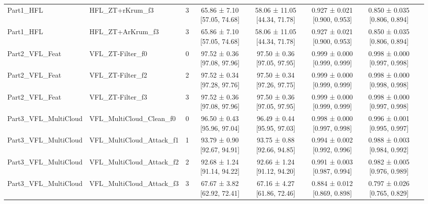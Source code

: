 \begin{table}[htbp]
\begin{tabular}{llcccccc}
Part1\_HFL & HFL\_ZT+rKrum\_f3 & 3 & 65.86 ± 7.10 [57.05, 74.68] & 58.06 ± 11.05 [44.34, 71.78] & 0.927 ± 0.021 [0.900, 0.953] & 0.850 ± 0.035 [0.806, 0.894] \\
Part1\_HFL & HFL\_ZT+ArKrum\_f3 & 3 & 65.86 ± 7.10 [57.05, 74.68] & 58.06 ± 11.05 [44.34, 71.78] & 0.927 ± 0.021 [0.900, 0.953] & 0.850 ± 0.035 [0.806, 0.894] \\
Part2\_VFL\_Feat & VFL\_ZT-Filter\_f0 & 0 & 97.52 ± 0.36 [97.08, 97.96] & 97.50 ± 0.36 [97.05, 97.95] & 0.999 ± 0.000 [0.999, 0.999] & 0.998 ± 0.000 [0.997, 0.998] \\
Part2\_VFL\_Feat & VFL\_ZT-Filter\_f2 & 2 & 97.52 ± 0.34 [97.28, 97.76] & 97.50 ± 0.34 [97.26, 97.75] & 0.999 ± 0.000 [0.999, 0.999] & 0.998 ± 0.000 [0.998, 0.998] \\
Part2\_VFL\_Feat & VFL\_ZT-Filter\_f3 & 3 & 97.52 ± 0.36 [97.08, 97.96] & 97.50 ± 0.36 [97.05, 97.95] & 0.999 ± 0.000 [0.999, 0.999] & 0.998 ± 0.000 [0.997, 0.998] \\
Part3\_VFL\_MultiCloud & VFL\_MultiCloud\_Clean\_f0 & 0 & 96.50 ± 0.43 [95.96, 97.04] & 96.49 ± 0.44 [95.95, 97.03] & 0.998 ± 0.000 [0.997, 0.998] & 0.996 ± 0.001 [0.995, 0.997] \\
Part3\_VFL\_MultiCloud & VFL\_MultiCloud\_Attack\_f1 & 1 & 93.79 ± 0.90 [92.67, 94.91] & 93.75 ± 0.88 [92.66, 94.85] & 0.994 ± 0.002 [0.992, 0.996] & 0.988 ± 0.003 [0.984, 0.992] \\
Part3\_VFL\_MultiCloud & VFL\_MultiCloud\_Attack\_f2 & 2 & 92.68 ± 1.24 [91.14, 94.22] & 92.66 ± 1.24 [91.12, 94.20] & 0.991 ± 0.003 [0.987, 0.994] & 0.982 ± 0.005 [0.976, 0.989] \\
Part3\_VFL\_MultiCloud & VFL\_MultiCloud\_Attack\_f3 & 3 & 67.67 ± 3.82 [62.92, 72.41] & 67.16 ± 4.27 [61.86, 72.46] & 0.884 ± 0.012 [0.869, 0.898] & 0.797 ± 0.026 [0.765, 0.829] \\
\bottomrule
\end{tabular}
\end{table}
